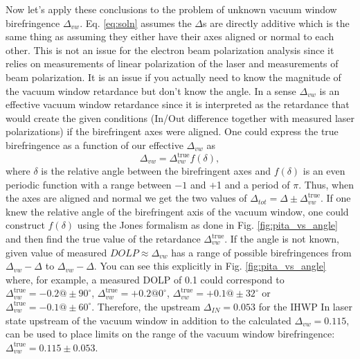 \documentclass[12pt]{article}
\begin{document}
Now let's apply these conclusions to the problem of unknown vacuum window birefringence $\Delta_{vw}$. Eq. \ref{eq:soln} assumes the $\Delta$s are directly additive which is the same thing as assuming they either have their axes aligned or normal to each other. This is not an issue for the electron beam polarization analysis since it relies on measurements of linear polarization of the laser and measurements of beam polarization. It is an issue if you actually need to know the magnitude of the vacuum window retardance but don't know the angle. In a sense $\Delta_{vw}$ is an effective vacuum window retardance since it is interpreted as the retardance that would create the given conditions (In/Out difference together with measured laser polarizations) if the birefringent axes were aligned. One could express the true birefringence as a function of our effective $\Delta_{vw}$ as
\[
\Delta_{vw}=\Delta^{\textrm{true}}_{vw}f(\delta),
\]
where $\delta$ is the relative angle between the birefringent axes and $f(\delta)$ is an even periodic function with a range between $-1$ and $+$1 and a period of $\pi$. Thus, when the axes are aligned and normal we get the two values of $\Delta_{tot}=\Delta\pm\Delta^{\textrm{true}}_{vw}$.  If one knew the relative angle of the birefringent axis of the vacuum window, one could construct $f(\delta)$ using the Jones formalism as done in Fig. \ref{fig:pita_vs_angle} and then find the true value of the retardance $\Delta^{\textrm{true}}_{vw}$. If the angle is not known, given value of measured $DOLP\approx\Delta_{vw}$ has a range of possible birefringences from $\Delta_{vw}-\Delta$ to $\Delta_{vw}-\Delta$. You can see this explicitly in Fig. \ref{fig:pita_vs_angle} where, for example, a measured DOLP of 0.1 could correspond to $\Delta^{\textrm{true}}_{vw}=-0.2@\pm90^{\circ}$, $\Delta^{\textrm{true}}_{vw}=+0.2@0^{\circ}$, $\Delta^{\textrm{true}}_{vw}=+0.1@\pm32^{\circ}$ or $\Delta^{\textrm{true}}_{vw}=-0.1@\pm60^{\circ}$. Therefore, the upstream $\Delta_{IN}=0.053$ for the IHWP In laser state upstream of the vacuum window in addition to the calculated $\Delta_{vw}=0.115$, can be used to place limits on the range of the vacuum window birefringence: $\Delta^{\textrm{true}}_{vw}=0.115\pm0.053$.
\newpage

%


\end{document}
